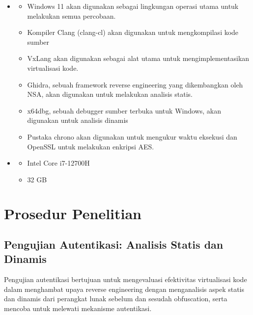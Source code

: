 \begin{itemize}
	\item {}
	      \begin{itemize}
		      \item {} Windows 11 akan digunakan sebagai lingkungan operasi utama untuk melakukan semua percobaan.
		      \item {} Kompiler Clang (clang-cl) akan digunakan untuk mengkompilasi kode sumber
		      \item {} VxLang akan digunakan sebagai alat utama untuk mengimplementasikan virtualisasi kode.
		      \item {} Ghidra, sebuah framework reverse engineering yang dikembangkan oleh NSA, akan digunakan untuk melakukan analisis statis.
		      \item {} x64dbg, sebuah debugger sumber terbuka untuk Windows, akan digunakan untuk analisis dinamis
		      \item {} Pustaka chrono akan digunakan untuk mengukur waktu eksekusi dan OpenSSL untuk melakukan enkripsi AES.
	      \end{itemize}
	\item {}
	      \begin{itemize}
		      \item {} Intel Core i7-12700H
		      \item {} 32 GB
	      \end{itemize}
\end{itemize}

\section{Prosedur Penelitian}
\subsection{Pengujian Autentikasi: Analisis Statis dan Dinamis}
Pengujian autentikasi bertujuan untuk mengevaluasi efektivitas virtualisasi kode dalam menghambat upaya reverse engineering dengan menganalisis aspek statis dan dinamis dari perangkat lunak sebelum dan sesudah obfuscation, serta mencoba untuk melewati mekanisme autentikasi.

